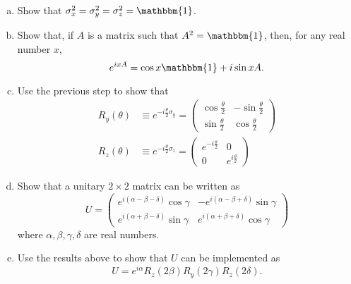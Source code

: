 \documentclass[a4paper,10pt]{article}
\begin{document}
\begin{enumerate}[a)]

\item Show that $\sigma_x^2 = \sigma_y^2 = \sigma_z^2 = \mathbbm{1}$.

\item Show that, if $A$ is a matrix such that $A^2=\mathbbm{1}$, then, for any real number $x$,
\begin{equation}
e^{ixA} = \cos{x} \mathbbm{1} + i \sin{x} A.
\end{equation}
\item Use the previous step to show that
\begin{align}
R_y(\theta) &\equiv e^{-i\frac{\theta}{2}\sigma_y} = \left(\begin{array}{cc} \cos{\frac{\theta}{2}} & -\sin{\frac{\theta}{2}} \\ \sin{\frac{\theta}{2}} & \cos{\frac{\theta}{2}} \end{array}\right) \\
R_z(\theta) &\equiv e^{-i\frac{\theta}{2}\sigma_z} = \left(\begin{array}{cc} e^{-i\frac{\theta}{2}} & 0 \\ 0 & e^{i\frac{\theta}{2}} \end{array}\right) 
\end{align}

\item Show that a unitary $2 \times 2$ matrix can be written as
\begin{equation}
U = \left(
\begin{array}{cc}
e^{i(\alpha-\beta-\delta)}\cos\gamma & -e^{i(\alpha-\beta+\delta)}\sin\gamma \\
e^{i(\alpha+\beta-\delta)}\sin\gamma &  e^{i(\alpha+\beta+\delta)}\cos\gamma
\end{array}
\right)
\end{equation}
where $\alpha,\beta,\gamma,\delta$ are real numbers.

\item Use the results above to show that $U$ can be implemented as
\begin{equation}
U = e^{i\alpha} R_z(2\beta) R_y(2\gamma) R_z(2\delta).
\end{equation}
\end{enumerate}
\end{document}
